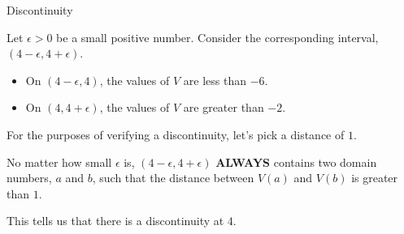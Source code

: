 \documentclass{ximera}
\begin{document}
\begin{explanation} Discontinuity


Let $\epsilon > 0$ be a small positive number.  Consider the corresponding interval, $(4 - \epsilon, 4 + \epsilon)$.

\begin{itemize}
\item On $(4 - \epsilon, 4)$, the values of $V$ are less than $-6$.
\item On $(4, 4 + \epsilon)$, the values of $V$ are greater than $-2$.
\end{itemize}


For the purposes of verifying a discontinuity, let's pick a distance of $1$.


No matter how small $\epsilon$ is, $(4 - \epsilon, 4 + \epsilon)$ \textbf{\textcolor{red!90!darkgray}{ALWAYS}} contains two domain numbers, $a$ and $b$, such that the distance between $V(a)$ and $V(b)$ is greater than $1$.

This tells us that there is a discontinuity at $4$.

\end{explanation}
\end{document}
